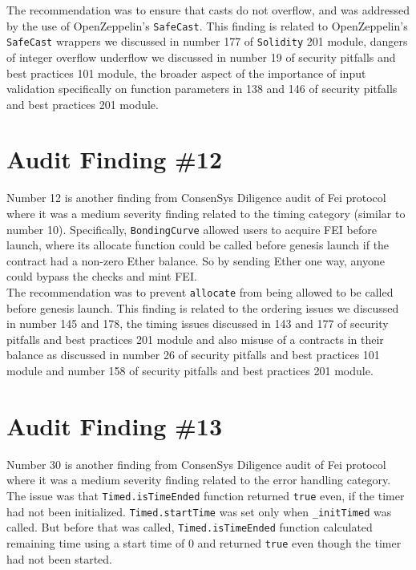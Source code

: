 The recommendation was to ensure that casts do not overflow, and was addressed by the use of OpenZeppelin's \verb|SafeCast|. This finding is related to OpenZeppelin's \verb|SafeCast| wrappers we discussed in number 177 of \verb|Solidity| 201 module, dangers of integer overflow underflow we discussed in number 19 of security pitfalls and best practices 101 module, the broader aspect of the importance of input validation specifically on function parameters in 138 and 146 of security pitfalls and best practices 201 module.

\section{Audit Finding \#12}

Number 12 is another finding from ConsenSys Diligence audit of Fei protocol where it was a medium severity finding related to the timing category (similar to number 10). Specifically, \verb|BondingCurve| allowed users to acquire FEI before launch, where its allocate function could be called before genesis launch if the contract had a non-zero Ether balance. So by sending Ether one way, anyone could bypass the checks and mint FEI.\\

The recommendation was to prevent \verb|allocate| from being allowed to be called before genesis launch. This finding is related to the ordering issues we discussed in number 145 and 178, the timing issues discussed in 143 and 177 of security pitfalls and best practices 201 module and also misuse of a contracts in their balance as discussed in number 26 of security pitfalls and best practices 101 module and number 158 of security pitfalls and best practices 201 module.

\section{Audit Finding \#13}

Number 30 is another finding from ConsenSys Diligence audit of Fei protocol where it was a medium severity finding related to the error handling category. The issue was that \verb|Timed.isTimeEnded| function returned \verb|true| even, if the timer had not been initialized. \verb|Timed.startTime| was set only when \verb|_initTimed| was called. But before that was called, \verb|Timed.isTimeEnded| function calculated remaining time using a start time of 0 and returned \verb|true| even though the timer had not been started.\\

